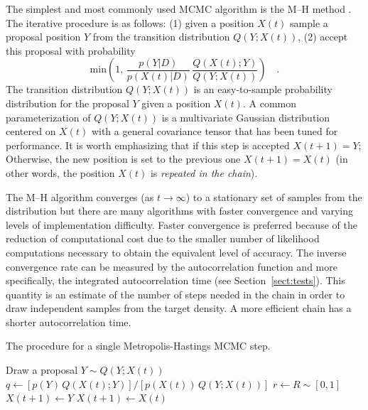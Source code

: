 \documentclass[12pt,preprint]{aastex}
\newcommand{\Sect}[1]{Section~\ref{sect:#1}}
\newcommand{\sect}[1]{\Sect{#1}}
\newcommand{\Algo}[1]{Algorithm~\ref{algo:#1}}
\newcommand{\algo}[1]{\Algo{#1}}
\newcommand{\algolabel}[1]{\label{algo:#1}}
\renewcommand{\vector}[1]{#1}
\newcommand{\pr}[1]{\ensuremath{p(#1)}}
\newcommand{\data}{\ensuremath{\vector{D}}}
\begin{document}
The simplest and most commonly used MCMC algorithm is the M--H method
\citep[\algo{mh};][]{MacKay:2003,Gregory:2005,Press:2007,Hogg:2010}.
The iterative procedure is as follows: (1) given a position
$X(t)$ sample a proposal position $Y$ from the transition distribution
$Q(Y; X(t))$, (2) accept this proposal with probability
\begin{equation}
    \mathrm{min} \left( 1,\,
            \frac{\pr{\vector{Y} | \data}}{\pr{\vector{X}(t) | \data}} \,
            \frac{Q(X(t); Y)}{ Q(Y;X(t))}  \right) \quad.
\end{equation}
The transition distribution $Q(Y; X(t))$ is an
easy-to-sample probability distribution for the proposal $Y$ given
a position $X(t)$.
A common parameterization of $Q(Y; X(t))$ is a multivariate Gaussian
distribution centered on $X(t)$ with a general covariance tensor that has
been tuned for performance.
It is worth emphasizing that if this step is accepted $X(t+1) = Y$; Otherwise,
the new position is set to the previous one $X(t+1) = X(t)$ (in other
words, the position $X(t)$ is \emph{repeated in the chain}).

The M--H algorithm converges (as $t \to \infty$) to a stationary set of
samples from the distribution but there are many algorithms with faster
convergence and varying levels of implementation difficulty.
Faster convergence is preferred because of the reduction of computational
cost due to the smaller number of likelihood computations necessary to obtain
the equivalent level of accuracy. The inverse convergence rate can be
measured by the autocorrelation function and more specifically, the integrated
autocorrelation time (see \sect{tests}). This quantity is an estimate of the
number of steps needed in the chain in order to draw independent samples from
the target density. A more efficient chain has a shorter
autocorrelation time.

\begin{algorithm}
\caption{The procedure for a single Metropolis-Hastings MCMC step.
    \algolabel{mh}}
\begin{algorithmic}[1]

\STATE Draw a proposal $Y \sim Q (Y; X(t))$
\STATE $q \gets [\pr{\vector{Y}} \, Q(X(t); Y)]
        / [\pr{\vector{X}(t)} \, Q(Y;X(t))]$%
            \hspace{1cm}{\footnotesize\it // This line is generally expensive}
\STATE $r \gets R \sim [0, 1]$
    \STATE $\vector{X}(t+1) \gets \vector{Y}$
\ELSE
    \STATE $\vector{X}(t+1) \gets \vector{X}(t)$
\ENDIF

\end{algorithmic}
\end{algorithm}
\end{document}
